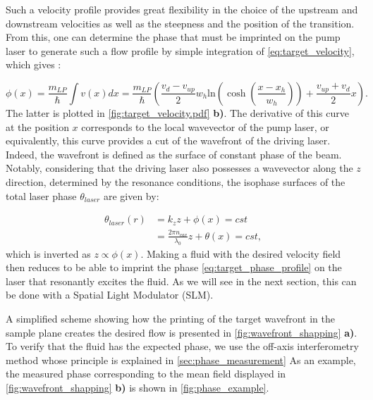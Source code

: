 Such a velocity profile provides great flexibility in the choice of the upstream and downstream velocities as well as the steepness and the position of the transition. From this, one can determine the phase that must be imprinted on the pump laser to generate such a flow profile by simple integration of \autoref{eq:target_velocity}, which gives :

\begin{equation}
    \phi(x) = \dfrac{m_{LP}}{\hbar} \int v(x) dx = \dfrac{m_{LP}}{\hbar} \left( \dfrac{v_{d}-v_{up}}{2} w_h \mathrm{ln}(\cosh(\dfrac{x-x_h}{w_h}))+\dfrac{v_{up}+v_{d}}{2}x \right).
    \label{eq:target_phase_profile}
\end{equation}
The latter is plotted in \autoref{fig:target_velocity.pdf} \textbf{b)}. The derivative of this curve at the position $x$ corresponds to the local wavevector of the pump laser, or equivalently, this curve provides a cut of the wavefront of the driving laser.
 Indeed, the wavefront is defined as the surface of constant phase of the beam. Notably, considering that the driving laser also possesses a wavevector along the $z$ direction, determined by the resonance conditions, the isophase surfaces of the total laser phase $\theta_{laser}$ are given by:  

\begin{equation}
    \begin{aligned}
    \theta_{laser}(r)&=k_zz+\phi(x)=cst \\
                      &=\frac{2\pi n_{cav} }{\lambda_0}z+\theta(x)= cst,
    \end{aligned}
\end{equation}
which is inverted as $z\propto \phi(x)$. Making a fluid with the desired velocity field then reduces to be able to imprint the phase \autoref{eq:target_phase_profile} on the laser that resonantly excites the fluid. As we will see in the next section, this can be done with a Spatial Light Modulator (SLM). 

 A simplified scheme showing how the printing of the target wavefront in the sample plane creates the desired flow is presented in \autoref{fig:wavefront_shapping} \textbf{a)}.
To verify that the fluid has the expected phase, we use the off-axis interferometry method whose principle is explained in \autoref{sec:phase_measurement}
As an example, the measured phase corresponding to the mean field displayed in \autoref{fig:wavefront_shapping} \textbf{b)} is shown in \autoref{fig:phase_example}.
 
